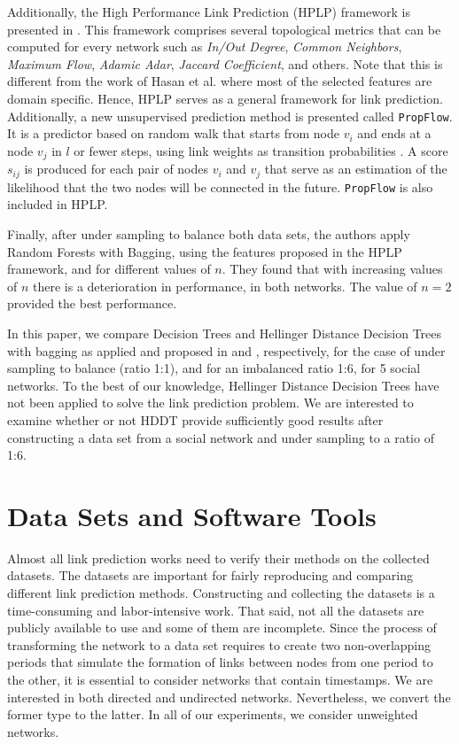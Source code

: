 \documentclass{acm_proc_article-sp}
\begin{document}
Additionally, the High Performance Link Prediction (HPLP) framework is presented in \cite{Lichtenwalter:2010:NPM:1835804.1835837}. This framework comprises several topological metrics that can be computed for every network such as \textit{In/Out Degree}, \textit{Common Neighbors}, \textit{Maximum Flow}, \textit{Adamic Adar}, \textit{Jaccard Coefficient}, and others. Note that this is different from the work of Hasan et al. \cite{Hasan06linkprediction} where most of the selected features are domain specific. Hence, HPLP serves as a general framework for link prediction. Additionally, a new unsupervised prediction method is presented called \texttt{PropFlow}. It is a predictor based on random walk that starts from node $v_i$ and ends at a node $v_j$ in $l$ or fewer steps, using link weights as transition probabilities \cite{Lichtenwalter:2010:NPM:1835804.1835837}. A score $s_{ij}$ is produced for each pair of nodes $v_i$ and $v_j$ that serve as an estimation of the likelihood that the two nodes will be connected in the future. \texttt{PropFlow} is also included in HPLP.

Finally, after under sampling to balance both data sets, the authors apply Random Forests with Bagging, using the features proposed in the HPLP framework, and for different values of $n$. They found that with increasing values of $n$ there is a deterioration in performance, in both networks. The value of $n=2$ provided the best performance.

In this paper, we compare Decision Trees and Hellinger Distance Decision Trees with bagging as applied and proposed in \cite{Hasan06linkprediction} and \cite{Lichtenwalter:2010:NPM:1835804.1835837}, respectively, for the case of under sampling to balance (ratio 1:1), and for an imbalanced ratio 1:6, for 5 social networks. To the best of our knowledge, Hellinger Distance Decision Trees have not been applied to solve the link prediction problem. We are interested to examine whether or not HDDT provide sufficiently good results after constructing a data set from a social network and under sampling to a ratio of 1:6.

\section{Data Sets and Software Tools}

Almost all link prediction works need to verify their methods on the collected datasets. The datasets are important for fairly reproducing and comparing different link prediction methods. Constructing and collecting the datasets is a time-consuming and labor-intensive work. That said, not all the datasets are publicly available to use and some of them are incomplete. Since the process of transforming the network to a data set requires to create two non-overlapping periods that simulate the formation of links between nodes from one period to the other, it is essential to consider networks that contain timestamps. We are interested in both directed and undirected networks. Nevertheless, we convert the former type to the latter. In all of our experiments, we consider unweighted networks.
\end{document}
